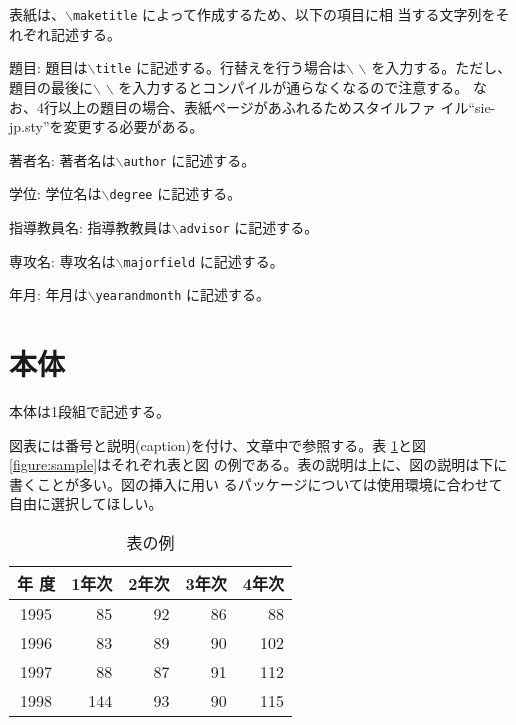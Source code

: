 \documentclass[a4paper,11pt]{jreport}
\begin{document}
表紙は、{\tt $\backslash$maketitle} によって作成するため、以下の項目に相
当する文字列をそれぞれ記述する。

\begin{description} \parskip=1pt
\item{題目: }
題目は{\tt $\backslash$title} に記述する。行替えを行う場合は$\backslash$
	   $\backslash$ を入力する。ただし、題目の最後に$\backslash$
	   $\backslash$ を入力するとコンパイルが通らなくなるので注意する。
	   なお、4行以上の題目の場合、表紙ページがあふれるためスタイルファ
	   イル``sie-jp.sty''を変更する必要がある。
\item{著者名: }
著者名は{\tt $\backslash$author} に記述する。
\item{学位: }
学位名は{\tt $\backslash$degree} に記述する。
\item{指導教員名: }
指導教教員は{\tt $\backslash$advisor} に記述する。
\item{専攻名: }
専攻名は{\tt $\backslash$majorfield} に記述する。
\item{年月: }
年月は{\tt $\backslash$yearandmonth} に記述する。
\end{description}

\section{本体}

本体は1段組で記述する。

図表には番号と説明(caption)を付け、文章中で参照する。表
\ref{table:fundamental_data_type}と図\ref{figure:sample}はそれぞれ表と図
の例である。表の説明は上に、図の説明は下に書くことが多い。図の挿入に用い
るパッケージについては使用環境に合わせて自由に選択してほしい。

\begin{table}[hbt]
\caption{表の例}
\label{table:fundamental_data_type}
\begin{center}
\begin{tabular}{| c | r | r | r | r |}
\hline
年 度 & 1年次 & 2年次 & 3年次 & 4年次 \\
\hline
1995 & 85 & 92 & 86 & 88 \\
1996 & 83 & 89 & 90 & 102 \\
1997 & 88 & 87 & 91 & 112 \\
1998 & 144 & 93 & 90 & 115 \\
\hline
\end{tabular}
\end{center}
\end{table}
\medskip
\end{document}
